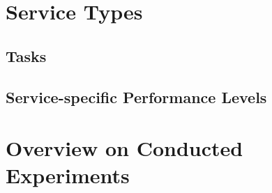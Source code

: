 \section{Service Types}

\subsection{Tasks}

\subsection{Service-specific Performance Levels}

\section{Overview on Conducted Experiments}

